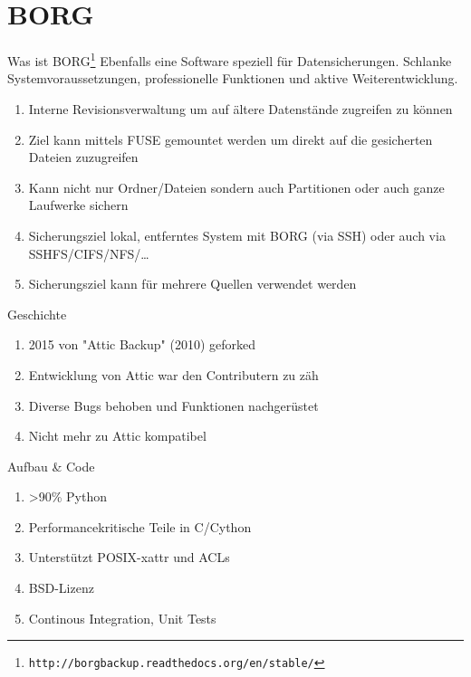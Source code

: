 \documentclass{beamer}
\begin{document}
\section{BORG}

\begin{frame}{Was ist BORG\footnote{\texttt{http://borgbackup.readthedocs.org/en/stable/}}}
  Ebenfalls eine Software speziell für Datensicherungen. Schlanke Systemvoraussetzungen, professionelle Funktionen und aktive Weiterentwicklung.\pause
  \begin{enumerate}[+]
  	\item Interne Revisionsverwaltung um auf ältere Datenstände zugreifen zu können\pause
    \item Ziel kann mittels FUSE gemountet werden um direkt auf die gesicherten Dateien zuzugreifen\pause
    \item Kann nicht nur Ordner/Dateien sondern auch Partitionen oder auch ganze Laufwerke sichern\pause
    \item Sicherungsziel lokal, entferntes System mit BORG (via SSH) oder auch via SSHFS/CIFS/NFS/…\pause
    \item Sicherungsziel kann für mehrere Quellen verwendet werden
  \end{enumerate}
\end{frame}

\begin{frame}{Geschichte}
  \begin{enumerate}[*]
    \item 2015 von "Attic Backup" (2010) geforked\pause
    \item Entwicklung von Attic war den Contributern zu zäh\pause
    \item Diverse Bugs behoben und Funktionen nachgerüstet\pause
    \item Nicht mehr zu Attic kompatibel
  \end{enumerate}
\end{frame}

\begin{frame}{Aufbau \& Code}
  \begin{enumerate}[*]
    \item >90\% Python\pause
    \item Performancekritische Teile in C/Cython\pause
    \item Unterstützt POSIX-xattr und ACLs\pause
    \item BSD-Lizenz\pause
    \item Continous Integration, Unit Tests
  \end{enumerate}
\end{frame}
\end{document}
